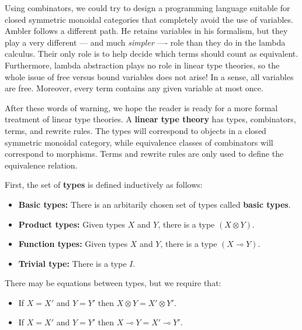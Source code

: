 \documentclass[12pt]{article}
\newcommand{\lhom}{\multimap}
\newcommand{\tensor}{\otimes}
\begin{document}
Using combinators, we could try to design a programming language
suitable for closed symmetric monoidal categories that completely
avoid the use of variables.  Ambler follows a different path.  He
retains variables in his formalism, but they play a very different ---
and much {\it simpler} ---- role than they do in the lambda calculus.
Their only role is to help decide which terms should count as
equivalent.  Furthermore, lambda abstraction plays no role in linear
type theories, so the whole issue of free versus bound variables does
not arise!  In a sense, all variables are free.  Moreover, every term
contains any given variable at most once.

After these words of warning, we hope the reader is ready for a more
formal treatment of linear type theories.  A {\bf linear type theory}
has types, combinators, terms, and rewrite rules.  The types will
correspond to objects in a closed symmetric monoidal category, while
equivalence classes of combinators will correspond to morphisms.  
Terms and rewrite rules are only used to define the equivalence relation.

First, the set of {\bf types} is defined inductively as follows:
\begin{itemize}
\item {\bf Basic types:}
There is an arbitarily chosen set of types called {\bf basic types}.
\item {\bf Product types:}
Given types $X$ and $Y$, there is a type $(X \tensor Y)$.
\item {\bf Function types:}
Given types $X$ and $Y$, there is a type $(X \lhom Y)$.
\item {\bf Trivial type:} There is a type $I$.
\end{itemize}
There may be equations between types, but we require that:
\begin{itemize}
\item
If $X = X'$ and $Y = Y'$ then $X \tensor Y = X' \tensor Y'$.
\item
If $X = X'$ and $Y = Y'$ then $X \lhom Y = X' \lhom Y'$.
\end{itemize}
\end{document}
